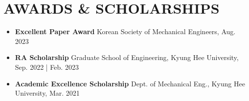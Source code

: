 \documentclass[a4paper,10pt]{extarticle}
\begin{document}

\section*{AWARDS \& SCHOLARSHIPS}
\begin{itemize}
	\item \textbf{Excellent Paper Award} \hfill Korean Society of Mechanical Engineers, Aug. 2023 %
	\item \textbf{RA Scholarship} \hfill Graduate School of Engineering, Kyung Hee University, Sep. 2022 | Feb. 2023 %
	\item \textbf{Academic Excellence Scholarship} \hfill Dept. of Mechanical Eng., Kyung Hee University, Mar. 2021 %
\end{itemize}

\end{document}
